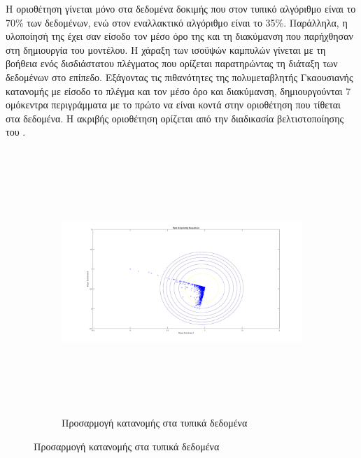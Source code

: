 Η οριοθέτηση γίνεται μόνο στα δεδομένα δοκιμής που στον τυπικό αλγόριθμο είναι το 70\% των δεδομένων, ενώ στον εναλλακτικό αλγόριθμο είναι το 35\%. Παράλληλα, η υλοποίησή της έχει σαν είσοδο τον μέσο όρο της και τη διακύμανση που παρήχθησαν στη δημιουργία του μοντέλου. Η χάραξη των ισοϋψών καμπυλών γίνεται με τη βοήθεια ενός δισδιάστατου πλέγματος που ορίζεται παρατηρώντας τη διάταξη των δεδομένων στο επίπεδο. Εξάγοντας τις πιθανότητες της πολυμεταβλητής Γκαουσιανής κατανομής με είσοδο το πλέγμα και τον μέσο όρο και διακύμανση, δημιουργούνται 7 ομόκεντρα περιγράμματα με το πρώτο να είναι κοντά στην οριοθέτηση που τίθεται στα δεδομένα. Η ακριβής οριοθέτηση ορίζεται από την διαδικασία βελτιστοποίησης του .\par
\clearpage
\begin{figure}[ht!]
\begin{subfigure}[b]{0.8\textwidth}
\includegraphics[width=160mm, height=100mm]{../../plots/gr_threshold_semi_sup_1.png}
\caption{Προσαρμογή κατανομής στα τυπικά δεδομένα}
\label{fig:threshanomalydetection1}
\end{subfigure}


\end{figure}

